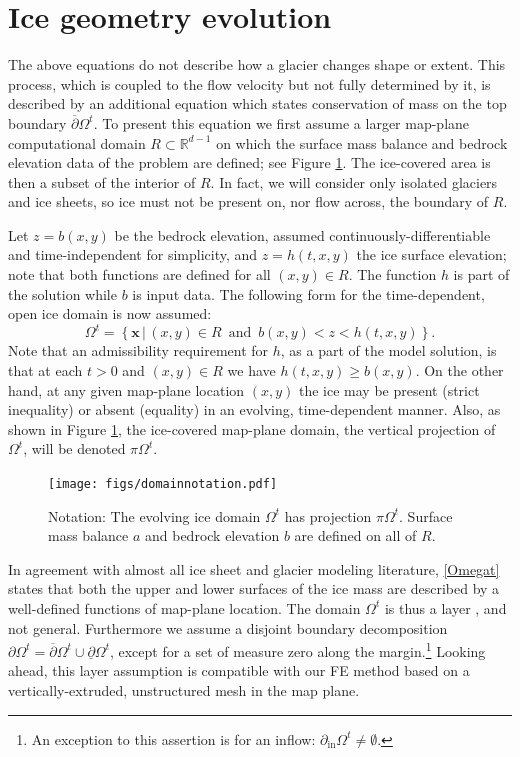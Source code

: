 \documentclass[letterpaper,final,12pt,reqno]{amsart}
\newcommand{\RR}{\mathbb{R}}
\newcommand{\bx}{\mathbf{x}}
\begin{document}
\section{Ice geometry evolution} \label{sec:stronggeometry}

The above equations do not describe how a glacier changes shape or extent.  This process, which is coupled to the flow velocity but not fully determined by it, is described by an additional equation which states conservation of mass on the top boundary $\overline{\partial} \Omega^t$.  To present this equation we first assume a larger map-plane computational domain $R\subset \RR^{d-1}$ on which the surface mass balance and bedrock elevation data of the problem are defined; see Figure \ref{fig:domainnotation}.  The ice-covered area is then a subset of the interior of $R$.  In fact, we will consider only isolated glaciers and ice sheets, so ice must not be present on, nor flow across, the boundary of $R$.

Let $z=b(x,y)$ be the bedrock elevation, assumed continuously-differentiable and time-independent for simplicity, and $z=h(t,x,y)$ the ice surface elevation; note that both functions are defined for all $(x,y)\in R$.  The function $h$ is part of the solution while $b$ is input data.  The following form for the time-dependent, open ice domain is now assumed:
\begin{equation}
\Omega^t = \left\{\bx\,\big|\,(x,y)\in R \,\text{ and }\, b(x,y) < z < h(t,x,y)\right\}.  \label{Omegat}
\end{equation}
Note that an admissibility requirement for $h$, as a part of the model solution, is that at each $t>0$ and $(x,y)\in R$ we have $h(t,x,y) \ge b(x,y)$.  On the other hand, at any given map-plane location $(x,y)$ the ice may be present (strict inequality) or absent (equality) in an evolving, time-dependent manner.  Also, as shown in Figure \ref{fig:domainnotation}, the ice-covered map-plane domain, the vertical projection of $\Omega^t$, will be denoted $\pi \Omega^t$.

\begin{figure}[ht]
\begin{center}
\texttt{[image: figs/domainnotation.pdf]}
\end{center}
\caption{Notation: The evolving ice domain $\Omega^t$ has projection $\pi \Omega^t$.  Surface mass balance $a$ and bedrock elevation $b$ are defined on all of $R$.}
\label{fig:domainnotation}
\end{figure}

In agreement with almost all ice sheet and glacier modeling literature, \eqref{Omegat} states that both the upper and lower surfaces of the ice mass are described by a well-defined functions of map-plane location.  The domain $\Omega^t$ is thus a layer \cite{Bueler2020}, and not general.  Furthermore we assume a disjoint boundary decomposition $\partial \Omega^t = \overline{\partial} \Omega^t \cup \underline{\partial} \Omega^t$, except for a set of measure zero along the margin.\footnote{An exception to this assertion is for an inflow: $\partial_{\text{in}} \Omega^t \ne \emptyset$.}  Looking ahead, this layer assumption is compatible with our FE method based on a vertically-extruded, unstructured mesh in the map plane.
\end{document}
